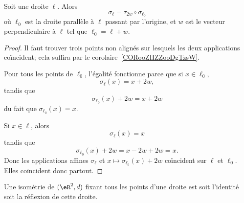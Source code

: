 \begin{lemma}   \label{LEMooVOJLooCFgdNG}
	Soit une droite \( \ell\). Alors
	\begin{equation}
		\sigma_{\ell}=\tau_{2w}\circ\sigma_{\ell_0}
	\end{equation}
	où \( \ell_0\) est la droite parallèle à \( \ell\) passant par l'origine, et \( w\) est le vecteur perpendiculaire à \( \ell\) tel que \( \ell_0=\ell+w\).
\end{lemma}

\begin{proof}
	Il faut trouver trois points non alignés sur lesquels les deux applications coïncident; cela suffira par le corolaire~\ref{CORooZHZZooDgTzsW}.

	Pour tous les points de \( \ell_0\), l'égalité fonctionne parce que si \( x\in\ell_0\),
	\begin{equation}
		\sigma_{\ell}(x)=x+2w,
	\end{equation}
	tandis que
	\begin{equation}
		\sigma_{\ell_0}(x)+2w=x+2w
	\end{equation}
	du fait que \( \sigma_{\ell_0}(x)=x\).

	Si \( x\in\ell\), alors
	\begin{equation}
		\sigma_{\ell}(x)=x
	\end{equation}
	tandis que
	\begin{equation}
		\sigma_{\ell_0}(x)+2w=x-2w+2w=x.
	\end{equation}
	Donc les applications affines \( \sigma_{\ell}\) et \( x\mapsto \sigma_{\ell_0}(x)+2w\) coïncident sur \( \ell\) et \( \ell_0\). Elles coïncident donc partout.
\end{proof}

\begin{lemma}		\label{LEMooRVKEooSlIrIR}
	Une isométrie de \( (\eR^2,d)\) fixant tous les points d'une droite est soit l'identité soit la réflexion de cette droite.
\end{lemma}

